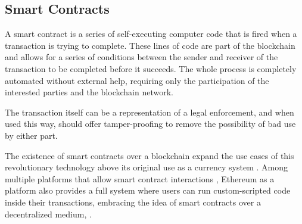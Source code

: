 \subsection{Smart Contracts}

A smart contract is a series of self-executing computer code that is fired when a transaction is trying to complete. These lines of code are part of the blockchain and allows for a series of conditions between the sender and receiver of the transaction to be completed before it succeeds. The whole process is completely automated without external help, requiring only the participation of the interested parties and the blockchain network.

The transaction itself can be a representation of a legal enforcement, and when used this way, should offer tamper-proofing to remove the possibility of bad use by either part. \cite{templates}

The existence of smart contracts over a blockchain expand the use cases of this revolutionary technology above its original use as a currency system \cite{nakamoto} \cite{uses}. Among multiple platforms that allow smart contract interactions \cite{sense}\cite{lazy}, Ethereum \cite{ethereum } as a platform also provides a full system where users can run custom-scripted code inside their transactions, embracing the idea of smart contracts over a decentralized medium, \cite{hawk}.



